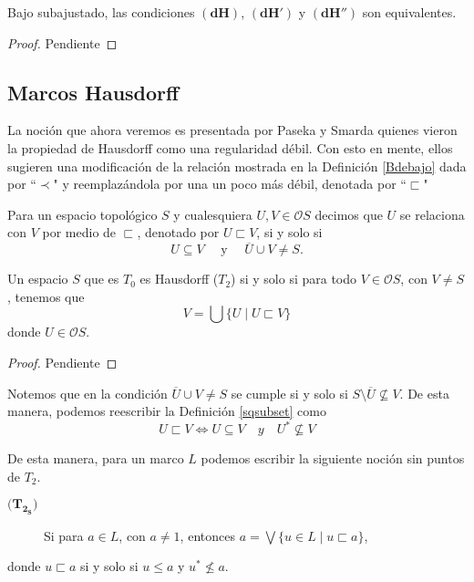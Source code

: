 \begin{prop}\label{Proposicion2.3.1}
    Bajo subajustado, las condiciones $\mathbf{(dH)}$, $\mathbf{(dH')}$ y $\mathbf{(dH'')}$ son equivalentes.
\end{prop}

\begin{proof}
    Pendiente
\end{proof}

\subsection{Marcos Hausdorff}

La noción que ahora veremos es presentada por Paseka y Smarda quienes vieron la propiedad de Hausdorff como una regularidad débil. Con esto en mente, ellos sugieren una modificación de la relación mostrada en la Definición \ref{Bdebajo} dada por ``$\prec$" y reemplazándola por una un poco más débil, denotada por ``$\sqsubset$" 

\begin{dfn}\label{sqsubset}
    Para un espacio topológico $S$ y cualesquiera $U, V\in \mathcal{O}S$ decimos que $U$ se relaciona con $V$ por medio de $\sqsubset$, denotado por $U\sqsubset V$, si y solo si 
    \[
    U\subseteq V\quad\mbox{ y }\quad \overline{U}\cup V\neq S.
    \]
\end{dfn}

\begin{prop}\label{Proposicion3.2}
    Un espacio $S$ que es $T_0$ es Hausdorff ($T_2$) si y solo si para todo $V\in \mathcal{O}S$, con $V\neq S$, tenemos que 
    \[
    V=\bigcup\{U\mid U\sqsubset V\}
    \]
    donde $U\in \mathcal{O}S$.
\end{prop}

\begin{proof}
    Pendiente
\end{proof}

Notemos que en la condición $\overline{U}\cup V\neq S$ se cumple si y solo si $S\setminus \overline{U}\nsubseteq V$. De esta manera, podemos reescribir la Definición \ref{sqsubset} como 
\[
U\sqsubset V\Leftrightarrow U\subseteq V\quad{ y }\quad U^*\nsubseteq V
\]

De esta manera, para un marco $L$ podemos escribir la siguiente noción sin puntos de $T_2$.
\begin{description}
    \item[$\mathbf{(T_{2_S}})$] Si para $a\in L$, con $a\neq 1$, entonces $a=\bigvee\{u\in L\mid u\sqsubset a\}$, 
\end{description}
donde $u\sqsubset a$ si y solo si $u\leq a$ y $u^*\nleq a$.\\

